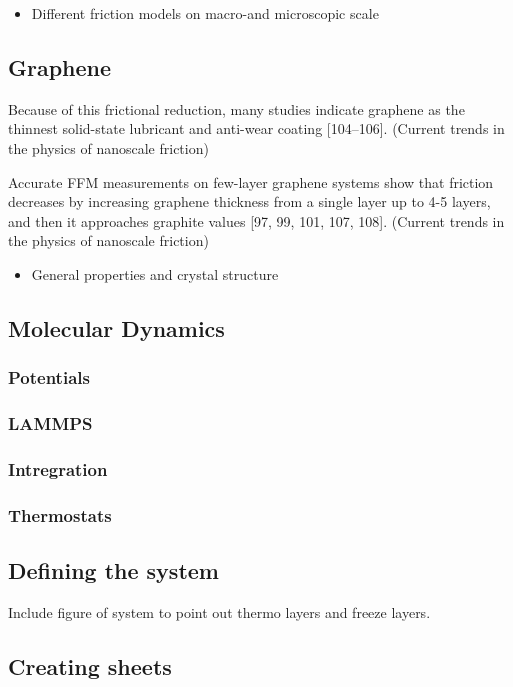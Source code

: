 \begin{itemize}
  \item Different friction models on macro-and microscopic scale
\end{itemize}
\subsection{Graphene}
Because of this frictional reduction, many studies indicate graphene as the thinnest solid-state lubricant and anti-wear coating [104–106]. (Current trends in the physics of nanoscale friction)


Accurate FFM measurements on few-layer graphene systems show that friction decreases by increasing graphene thickness from a single layer up to 4-5 layers, and then it approaches graphite values [97, 99, 101, 107, 108]. (Current trends in the physics of nanoscale friction)



\begin{itemize}
  \item General properties and crystal structure
\end{itemize}
\subsection{Molecular Dynamics}
\subsubsection{Potentials}
\subsubsection{LAMMPS}
\subsubsection{Intregration}
\subsubsection{Thermostats}


\subsection{Defining the system}
Include figure of system to point out thermo layers and freeze layers.

\subsection{Creating sheets}

